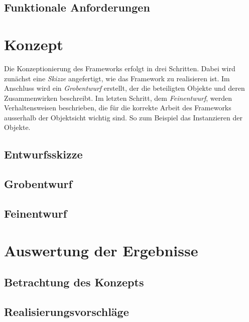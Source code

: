 \documentclass{hswpaper}
\begin{document}
\subsection{Funktionale Anforderungen}

\section{Konzept}
Die Konzeptionierung des Frameworks erfolgt in drei Schritten. Dabei wird zunächst eine \emph{Skizze} angefertigt, wie das Framework zu realisieren ist. Im Anschluss wird ein \emph{Grobentwurf} erstellt, der die beteiligten Objekte und deren Zusammenwirken beschreibt. Im letzten Schritt, dem \emph{Feinentwurf}, werden Verhaltensweisen beschrieben, die für die korrekte Arbeit des Frameworks ausserhalb der Objektsicht wichtig sind. So zum Beispiel das Instanzieren der Objekte.
\subsection{Entwurfsskizze}
\subsection{Grobentwurf}
\subsection{Feinentwurf}

\section{Auswertung der Ergebnisse}
\subsection{Betrachtung des Konzepts}
\subsection{Realisierungsvorschläge}
\end{document}
